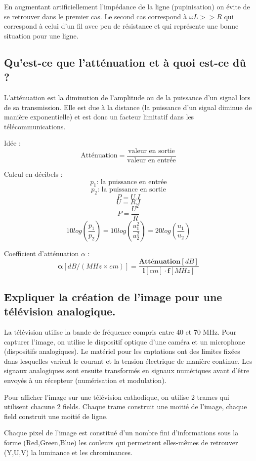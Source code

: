 En augmentant artificiellement l'impédance de la ligne (pupinisation) on évite de se retrouver dans le premier cas. Le second cas correspond à $\omega L >> R$ qui correspond à celui d'un fil avec peu de résistance et qui représente une bonne situation pour une ligne.


\subsection{Qu'est-ce que l'atténuation et à quoi est-ce dû ?}

L'atténuation est la diminution de l'amplitude ou de la puissance d'un signal lors de sa transmission. Elle est due à la distance (la puissance d'un signal diminue de manière exponentielle) et est donc un facteur limitatif dans les télécommunications.

Idée :
\[
    \textrm{Atténuation} = \frac{\textrm{valeur en
    sortie}}{\textrm{valeur en entrée}}
\]
\bigskip

Calcul en décibels :
\[ p_1 \textrm{: la puissance en entrée} \]
\[ p_2 \textrm{: la puissance en sortie} \]
\[ P = U.I \]
\[ U = R.I \]
\[ P = \frac{U^{2}}{R} \]
\[
    10 log(\frac{p_1}{p_2}) = 10 log(\frac{u_1^2}{u_2^2}) = 20
    log(\frac{u_1}{u_2})
\]

Coefficient d'atténuation $\alpha$ : 
\[ \bm{\alpha} [dB/(MHz \times cm)] =
\frac{\bm{Atténuation} [dB]}{\mathbf{l} [cm] \cdot \mathbf{f} [MHz]} \]

\subsection{Expliquer la création de l'image pour une télévision analogique.}

La télévision utilise la bande de fréquence compris entre 40 et 70 MHz.  Pour capturer l'image, on utilise le dispositif optique d'une caméra et un microphone (dispositifs analogiques). Le matériel pour les captations ont des limites fixées dans lesquelles varient le courant et la tension électrique de manière continue. Les signaux analogiques sont ensuite transformés en signaux numériques avant d'être envoyés à un récepteur (numérisation et modulation).

Pour afficher l'image sur une télévision cathodique, on utilise 2 trames qui utilisent chacune 2 fields. Chaque trame construit une moitié de l'image, chaque field construit une moitié de ligne.

Chaque pixel de l'image est constitué d'un nombre fini d'informations sous la forme (Red,Green,Blue) les couleurs qui permettent elles-mêmes de retrouver (Y,U,V) la luminance et les chrominances.

